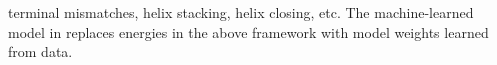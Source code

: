 terminal mismatches, helix stacking, helix closing, etc.
The machine-learned model in \contrafold
replaces energies in the above framework with model weights learned from data.



